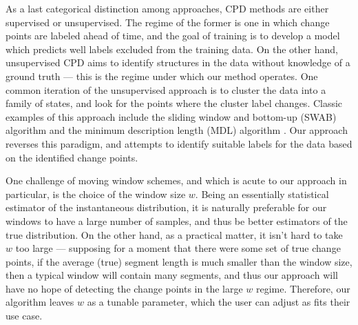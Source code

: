 \documentclass{article}
\begin{document}
As a last categorical distinction among approaches, CPD methods are either supervised or unsupervised. The regime of the former is one in which change points are labeled ahead of time, and the goal of training is to develop a model which predicts well labels excluded from the training data. On the other hand, unsupervised CPD aims to identify structures in the data without knowledge of a ground truth --- this is the regime under which our method operates.  One common iteration of the unsupervised approach is to cluster the data into a family of states, and look for the points where the cluster label changes. Classic examples of this approach include the sliding window and bottom-up (SWAB) algorithm \cite{keoghOnlineAlgorithmSegmenting2001} and the minimum description length (MDL) algorithm \cite{rakthanmanonTimeSeriesEpenthesis2011}. Our approach reverses this paradigm, and attempts to identify suitable labels for the data based on the identified change points.

One challenge of moving window schemes, and which is acute to our approach in particular, is the choice of the window size \(w\). Being an essentially statistical estimator of the instantaneous distribution, it is naturally preferable for our windows to have a large number of samples, and thus be better estimators of the true distribution. On the other hand, as a practical matter, it isn't hard to take \(w\) too large --- supposing for a moment that there were some set of true change points, if the average (true) segment length is much smaller than the window size, then a typical window will contain many segments, and thus our approach will have no hope of detecting the change points in the large \(w\) regime. Therefore, our algorithm leaves \(w\) as a tunable parameter, which the user can adjust as fits their use case.
\end{document}
